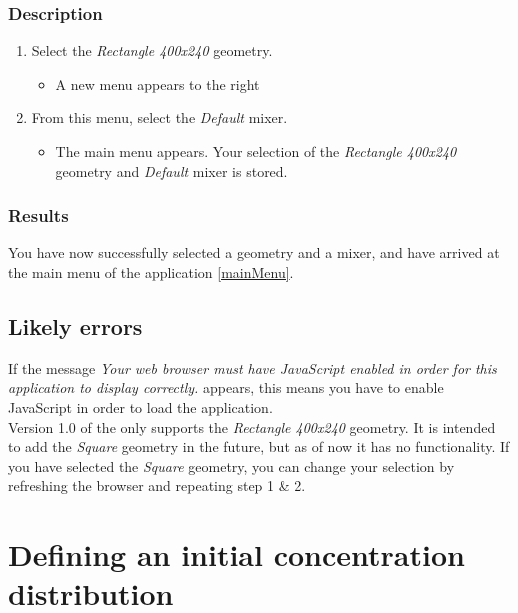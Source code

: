\subsubsection{Description}

\begin{enumerate}
\item Select the \emph{Rectangle 400x240} geometry.
\begin{itemize}
  \item A new menu appears to the right
\end{itemize}
\item From this menu, select the \emph{Default} mixer.
\begin{itemize}
  \item The main menu appears. Your selection of the \emph{Rectangle 400x240} geometry and \emph{Default} mixer is stored.
\end{itemize}
\end{enumerate}

\subsubsection{Results}
You have now successfully selected a geometry and a mixer, and have arrived at the main menu of the application \ref{mainMenu}.


\subsection{Likely errors}
If the message \emph{Your web browser must have JavaScript enabled in order for this application to display correctly.} appears, this means you have to enable JavaScript in order to load the application.\\

\noindent Version 1.0 of the \applicationname{} only supports the \emph{Rectangle 400x240} geometry. It is intended to add the \emph{Square} geometry in the future, but as of now it has no functionality. If you have selected the \emph{Square} geometry, you can change your selection by refreshing the browser and repeating step 1 \& 2.\\


\section{Defining an initial concentration distribution}
\label{sec:defineDist}

